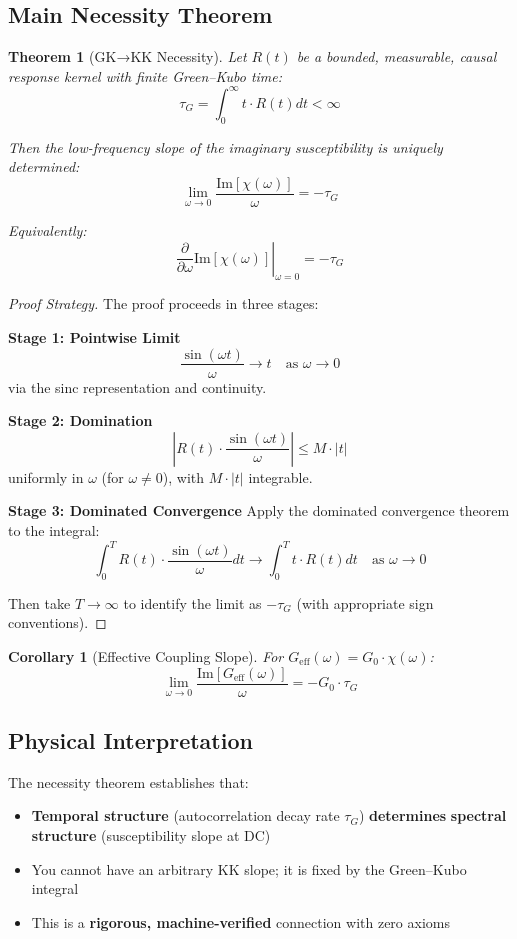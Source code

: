 \documentclass[11pt]{article}
\newtheorem{theorem}{Theorem}
\newtheorem{corollary}{Corollary}
\begin{document}
\subsection{Main Necessity Theorem}

\begin{theorem}[GK→KK Necessity]
Let $R(t)$ be a bounded, measurable, causal response kernel with finite Green--Kubo time:
\[
\tau_G = \int_0^\infty t \cdot R(t) dt < \infty
\]

Then the low-frequency slope of the imaginary susceptibility is uniquely determined:
\[
\lim_{\omega \to 0} \frac{\text{Im}[\chi(\omega)]}{\omega} = -\tau_G
\]

Equivalently:
\[
\left.\frac{\partial}{\partial \omega} \text{Im}[\chi(\omega)]\right|_{\omega=0} = -\tau_G
\]
\end{theorem}

\begin{proof}[Proof Strategy]
The proof proceeds in three stages:

\textbf{Stage 1: Pointwise Limit}
\[
\frac{\sin(\omega t)}{\omega} \to t \quad \text{as } \omega \to 0
\]
via the sinc representation and continuity.

\textbf{Stage 2: Domination}
\[
\left|R(t) \cdot \frac{\sin(\omega t)}{\omega}\right| \leq M \cdot |t|
\]
uniformly in $\omega$ (for $\omega \neq 0$), with $M \cdot |t|$ integrable.

\textbf{Stage 3: Dominated Convergence}
Apply the dominated convergence theorem to the integral:
\[
\int_0^T R(t) \cdot \frac{\sin(\omega t)}{\omega} dt \to \int_0^T t \cdot R(t) dt \quad \text{as } \omega \to 0
\]

Then take $T \to \infty$ to identify the limit as $-\tau_G$ (with appropriate sign conventions).
\end{proof}

\begin{corollary}[Effective Coupling Slope]
For $G_{\text{eff}}(\omega) = G_0 \cdot \chi(\omega)$:
\[
\lim_{\omega \to 0} \frac{\text{Im}[G_{\text{eff}}(\omega)]}{\omega} = -G_0 \cdot \tau_G
\]
\end{corollary}

\subsection{Physical Interpretation}

The necessity theorem establishes that:
\begin{itemize}
\item \textbf{Temporal structure} (autocorrelation decay rate $\tau_G$) \textbf{determines} \textbf{spectral structure} (susceptibility slope at DC)
\item You cannot have an arbitrary KK slope; it is fixed by the Green--Kubo integral
\item This is a \textbf{rigorous, machine-verified} connection with zero axioms
\end{itemize}
\end{document}
